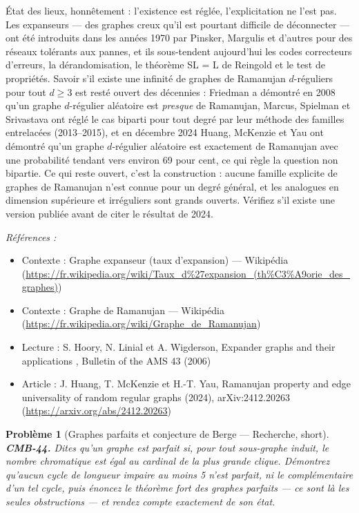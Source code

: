 \documentclass[11pt]{article}
\newtheorem{problem}{Problème}
\newenvironment{refs}{\par\small\noindent\emph{Références :}\begin{itemize}\setlength\itemsep{0pt}}{\end{itemize}\normalsize}
\begin{document}
\noindent État des lieux, honnêtement : l'existence est réglée, l'explicitation ne l'est pas. Les expanseurs --- des graphes creux qu'il est pourtant difficile de déconnecter --- ont été introduits dans les années 1970 par Pinsker, Margulis et d'autres pour des réseaux tolérants aux pannes, et ils sous-tendent aujourd'hui les codes correcteurs d'erreurs, la dérandomisation, le théorème SL = L de Reingold et le test de propriétés. Savoir s'il existe une infinité de graphes de Ramanujan $ d $-réguliers pour tout $ d \ge 3 $ est resté ouvert des décennies : Friedman a démontré en 2008 qu'un graphe $ d $-régulier aléatoire est \textit{presque} de Ramanujan, Marcus, Spielman et Srivastava ont réglé le cas biparti pour tout degré par leur méthode des familles entrelacées (2013--2015), et en décembre 2024 Huang, McKenzie et Yau ont démontré qu'un graphe $ d $-régulier aléatoire est exactement de Ramanujan avec une probabilité tendant vers environ 69 pour cent, ce qui règle la question non bipartie. Ce qui reste ouvert, c'est la construction : aucune famille explicite de graphes de Ramanujan n'est connue pour un degré général, et les analogues en dimension supérieure et irréguliers sont grands ouverts. Vérifiez s'il existe une version publiée avant de citer le résultat de 2024.

\begin{refs}
\item Contexte : Graphe expanseur (taux d'expansion) --- Wikipédia (\url{https://fr.wikipedia.org/wiki/Taux_d%27expansion_(th%C3%A9orie_des_graphes)})
\item Contexte : Graphe de Ramanujan --- Wikipédia (\url{https://fr.wikipedia.org/wiki/Graphe_de_Ramanujan})
\item Lecture : S. Hoory, N. Linial et A. Wigderson, \og{} Expander graphs and their applications \fg{}, Bulletin of the AMS 43 (2006)
\item Article : J. Huang, T. McKenzie et H.-T. Yau, \og{} Ramanujan property and edge universality of random regular graphs \fg{} (2024), arXiv:2412.20263 (\url{https://arxiv.org/abs/2412.20263})
\end{refs}

\bigskip

\begin{problem}[{Graphes parfaits et conjecture de Berge --- Recherche, short}]
\textbf{CMB-44.} Dites qu'un graphe est \textit{parfait} si, pour tout sous-graphe induit, le nombre chromatique est égal au cardinal de la plus grande clique. Démontrez qu'aucun cycle de longueur impaire au moins 5 n'est parfait, ni le complémentaire d'un tel cycle, puis énoncez le théorème fort des graphes parfaits --- ce sont là les seules obstructions --- et rendez compte exactement de son état.
\end{problem}
\end{document}
